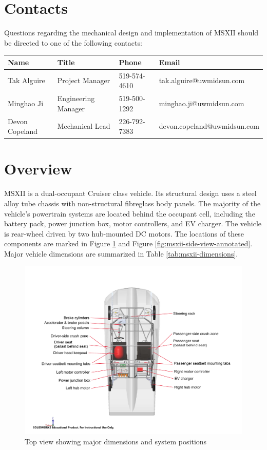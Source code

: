 \documentclass[10pt]{article}
\begin{document}
\section{Contacts}
Questions regarding the mechanical design and implementation of MSXII should be directed to one of the following contacts:

\begin{table}[!h]
\centering
\begin{tabular}{llll}
\toprule
Name            & Title               & Phone        & Email \\
\midrule
Tak Alguire     & Project Manager     & 519-574-4610 & tak.alguire@uwmidsun.com \\
Minghao Ji      & Engineering Manager & 519-500-1292 & minghao.ji@uwmidsun.com \\
Devon Copeland  & Mechanical Lead     & 226-792-7383 & devon.copeland@uwmidsun.com \\
\bottomrule
\end{tabular}
\end{table}

\section{Overview}
MSXII is a dual-occupant Cruiser class vehicle. Its structural design uses a steel alloy tube chassis with non-structural fibreglass body panels. The majority of the vehicle's powertrain systems are located behind the occupant cell, including the battery pack, power junction box, motor controllers, and EV charger. The vehicle is rear-wheel driven by two hub-mounted DC motors. The locations of these components are marked in Figure \ref{fig:msxii-top-view-annotated} and Figure \ref{fig:msxii-side-view-annotated}. Major vehicle dimensions are summarized in Table \ref{tab:msxii-dimensions}.

\begin{figure}
\centering
\includegraphics[width=\textwidth]{figures/msxii-top-view-annotated}
\caption{Top view showing major dimensions and system positions}
\label{fig:msxii-top-view-annotated}
\end{figure}
\end{document}

